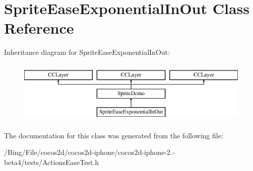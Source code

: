 \hypertarget{interface_sprite_ease_exponential_in_out}{\section{Sprite\-Ease\-Exponential\-In\-Out Class Reference}
\label{interface_sprite_ease_exponential_in_out}
}
Inheritance diagram for Sprite\-Ease\-Exponential\-In\-Out\-:\begin{figure}[H]
\begin{center}
\leavevmode
\includegraphics[height=3.000000cm]{interface_sprite_ease_exponential_in_out}
\end{center}
\end{figure}


The documentation for this class was generated from the following file\-:\begin{DoxyCompactItemize}
\item 
/\-Bing/\-File/cocos2d/cocos2d-\/iphone/cocos2d-\/iphone-\/2.-\/beta4/tests/Actions\-Ease\-Test.\-h\end{DoxyCompactItemize}

